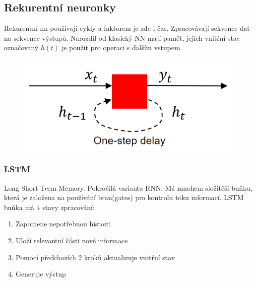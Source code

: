 \subsection{Rekurentní neuronky}
Rekurentní nn používají cykly a faktorem je zde i čas.
Zpracovávají sekvence dat na sekvence výstupů. Narozdíl od klasický NN mají paměť, jejich vnitřní stav označovaný \(h(t)\) je použit pro operaci s dalším vstupem.\\
\begin{figure}[ht]
    \centering
    \includegraphics[scale = 0.5]{images/RNN.png}
\end{figure}

\subsubsection{LSTM}
Long Short Term Memory. Pokročilá varianta RNN. Má mnohem složitěší buňku, která je založena na používání bran(gates) pro kontrolu toku informací. LSTM buňka má
4 stavy zpracování:
\begin{enumerate}
    \item Zapomene nepotřebnou historii
    \item Uloží relevantní části nové informace
    \item Pomocí předchozích 2 kroků aktualizuje vnitřní stav
    \item Generuje výstup
\end{enumerate}
